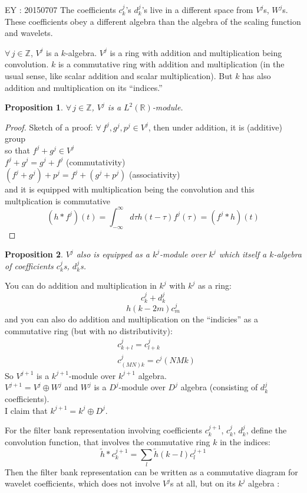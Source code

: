 \documentclass[twoside]{amsart}
\theoremstyle{plain}
\newtheorem{proposition}{Proposition}
\theoremstyle{definition}
\theoremstyle{remark}
\numberwithin{equation}{section}
\begin{document}
EY : 20150707 The coefficients $c_k^j$'s $d_k^j$'s live in a different space from $V^j$s, $W^j$s.  These coefficients obey a different algebra than the algebra of the scaling function and wavelets.  

$\forall \, j \in \mathbb{Z}$, $V^j$ is a $k$-algebra.  $V^j$ is a ring with addition and multiplication being convolution.  $k$ is a commutative ring with addition and multiplication (in the usual sense, like scalar addition and scalar multiplication).  But $k$ has also addition and multiplication on its ``indices.''  \cite{EYeung2015}

\begin{proposition}
$\forall \, j \in \mathbb{Z}$, $V^j$ is a $L^2(\mathbb{R})$-module.  
\end{proposition}
\begin{proof}
  Sketch of a proof: $\forall \, f^j, g^j, p^j \in V^j$, then under addition, it is (additive) group \\ so that $f^j + g^j \in V^j$ \\
$f^j + g^j = g^j + f^j$ (commutativity) \\
$(f^j + g^j) + p^j = f^j + (g^j + p^j)$ (associativity) \\

and it is equipped with multiplication being the convolution and this multplication is commutative
\[
(h*f^j)(t) = \int_{-\infty}^{\infty} d\tau h(t-\tau)f^j(\tau) = (f^j*h)(t)
\]
\end{proof}

\begin{proposition}
$V^j$ also is equipped as a $k^j$-module over $k^j$ which itself a $k$-algebra of coefficients $c^j_k$s, $d^j_k$s.  
\end{proposition}
You can do addition and multiplication in $k^j$ with $k^j$ as a ring: 
\[
c^j_k + d^j_k
\]
\[
h(k-2m)c_m^j
\]
and you can also do addition and multiplication on the ``indicies'' as a commutative ring (but with no distributivity):
\[
\begin{aligned}
  & c^j_{k+l} = c^j_{l+k} \\ 
  & c^j_{(MN)k} = c^j{(NMk)}
\end{aligned}
\]
So $V^{j+1}$ is a $k^{j+1}$-module over $k^{j+1}$ algebra.  \\
$V^{j+1} = V^j\oplus W^j$ and $W^j$ is a $D^j$-module over $D^j$ algebra (consisting of $d^j_k$ coefficients).  \\
I claim that $k^{j+1} = k^j\oplus D^j$.  

For the filter bank representation involving coefficients $c_k^{j+1}$, $c_k^j$, $d_k^j$, define the convolution function, that involves the commutative ring $k$ in the indices:
\[
\widetilde{h}* c_k^{j+1} = \sum_l \widetilde{h}(k-l)c_l^{j+1}
\]
Then the filter bank representation can be written as a commutative diagram for wavelet coefficients, which does not involve $V^j$s at all, but on its $k^j$ algebra \cite{EYeung2015}:
\end{document}
